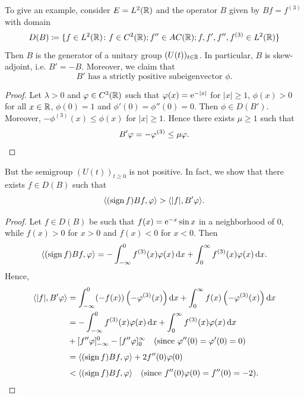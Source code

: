 To give an example, consider $E = L^{2}(\mathbb{R})$ and the operator $B$ given by 
$Bf = f^{(3)}$ with domain
\[
D(B) \coloneq \{f \in L^{2}(\mathbb{R}) \colon f \in C^{2}(\mathbb{R}); f'' \in AC(\mathbb{R}) ; f,f',f'',f^{(3)} \in L^{2}(\mathbb{R})\}
\]
Then $B$ is the generator of a unitary group $(U(t))_{t \in \mathbb{R}}$. 
In particular, $B$ is skew-adjoint, i.e. $B' = -B$.
Moreover, we claim that
\begin{equation}\label{eq:c2-3.18}
B' \text{ has a strictly positive subeigenvector } \phi.
\end{equation}
\begin{proof}
Let $\lambda > 0$ and $\phi \in C^{3}(\R)$ such that $\phi(x) = \eu^{-|x|}$ for
$|x| \geq 1$, $\phi(x) > 0$ for all $x \in \mathbb{R}$, $\phi(0) = 1$ and $\phi'(0) = \phi''(0) = 0$.
Then $\phi \in D(B')$. 
Moreover, $-\phi^{(3)}(x) \leq \phi(x)$ for $|x| \geq 1$. 
Hence there exists $\mu \geq 1$ such that
%
\begin{equation*}
	B'\phi = -\phi^{(3)} \leq \mu\phi.
\qedhere
\end{equation*}
\end{proof}
But the semigroup $(U(t))_{t \geq 0}$ is not positive. 
In fact, we show that there exists $f \in D(B)$ such that
\begin{equation}\label{eq:c2-3.19}
\langle(\sign  f)Bf,\phi\rangle > \langle|f|,B'\phi\rangle.
\end{equation}
\begin{proof}
Let $f \in D(B)$ be such that $f(x) = \mathrm{e}^{-x} \sin x$ in a neighborhood of\/ $0$, while $f(x) > 0$ for $x > 0$ and $f(x) < 0$ for $x < 0$. 
Then
\begin{align*}
\langle(\sign  f)Bf,\phi\rangle = - \int_{-\infty}^{0} f^{(3)}(x)\phi(x) \dx + \int_{0}^{\infty} f^{(3)}(x)\phi(x) \dx.
\end{align*}
Hence, 
\begin{align*}
\langle|f|,B'\phi\rangle &= \int_{-\infty}^{0} (-f(x))\left(-\phi^{(3)}(x)\right) \dx + \int_{0}^{\infty} f(x)\left(-\phi^{(3)}(x)\right) \dx\\
&= - \int_{-\infty}^{0} f^{(3)}(x)\phi(x) \dx + \int_{0}^{\infty} f^{(3)}(x)\phi(x) \dx\\
&+ [f''\phi]_{-\infty}^{0} - [f''\phi]_{0}^{\infty} \quad \text{(since $\phi''(0)=\phi'(0)=0$)}\\[1ex]
&= \langle(\sign  f) Bf,\phi\rangle + 2f''(0)\phi(0)\\[1ex]
&< \langle(\sign  f) Bf,\phi\rangle \quad \text{(since $f''(0)\phi(0) = f''(0) = -2$)}.
\tag*{\qedsymbol}%
\end{align*}
\let\qedsymbol\relax
\end{proof}
